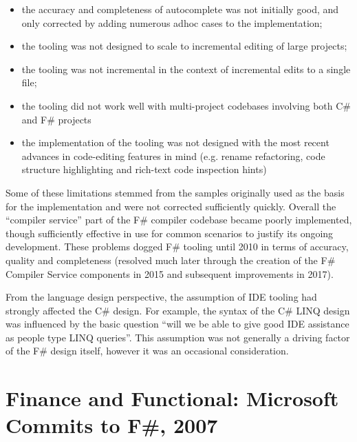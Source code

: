 \documentclass[acmsmall,screen]{acmart}
\begin{document}
\begin{itemize}
\item the accuracy and completeness of autocomplete was not initially good, and only corrected by adding numerous adhoc cases to the implementation;
\item the tooling was not designed to scale to incremental editing of large projects;
\item the tooling was not incremental in the context of incremental edits to a single file;
\item the tooling did not work well with multi-project codebases involving both C\# and F\# projects
\item the implementation of the tooling was not designed with the most recent advances in code-editing features in mind (e.g. rename refactoring, code structure highlighting and rich-text code inspection hints) 
\end{itemize}

Some of these limitations stemmed from the samples originally used as the basis for the implementation and were not
corrected sufficiently quickly.  Overall the “compiler service” part of the F\# compiler codebase became poorly implemented,
though sufficiently effective in use for common scenarios to justify its ongoing development.  These problems
dogged F\# tooling until 2010 in terms of accuracy, quality and completeness (resolved much later
through the creation of the F\# Compiler Service components in 2015 and subsequent improvements in 2017).

From the language design perspective, the assumption of IDE tooling had strongly affected the C\# design.  For
example, the syntax of the C\# LINQ design was influenced by the basic question “will we be able to give good
IDE assistance as people type LINQ queries”.  This assumption was not generally a driving factor of the F\# design itself, however it was an occasional consideration.



\section*{Finance and Functional: Microsoft Commits to F\#, 2007}
\end{document}
